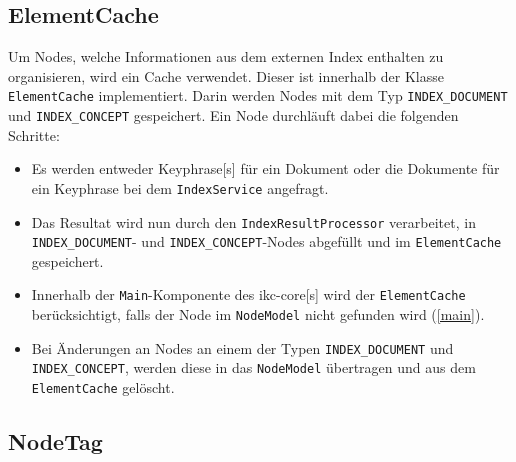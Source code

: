
\subsection{ElementCache}


Um Nodes, welche Informationen aus dem externen Index enthalten zu organisieren, wird ein Cache verwendet. Dieser ist innerhalb der Klasse \texttt{ElementCache} implementiert. Darin werden Nodes mit dem Typ \verb|INDEX_DOCUMENT| und \verb|INDEX_CONCEPT| gespeichert. Ein Node durchläuft dabei die folgenden Schritte:
\begin{itemize}
    \item Es werden entweder \gls{Keyphrase}[s] für ein Dokument oder die Dokumente für ein \gls{Keyphrase} bei dem \texttt{IndexService} angefragt. 
    \item Das Resultat wird nun durch den \texttt{Index\-Result\-Pro\-cessor} verarbeitet, in \verb|INDEX_DOCUMENT|- und \verb|INDEX_CONCEPT|-Nodes abgefüllt und im \texttt{ElementCache} gespeichert.
    \item Innerhalb der \texttt{Main}-Komponente des \gls{ikc-core}[s] wird der \texttt{Ele\-ment\-Cache} berücksichtigt, falls der Node im \texttt{NodeModel} nicht gefunden wird (\autoref{main}).
    
    
    \item Bei Änderungen an Nodes an einem der Typen \verb|INDEX_DOCUMENT| und \verb|INDEX_CONCEPT|, werden diese in das \texttt{NodeModel} übertragen und aus dem \texttt{ElementCache} gelöscht.

\end{itemize}


\subsection{NodeTag}

